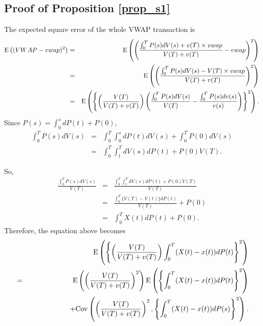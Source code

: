 \subsection{Proof of Proposition \ref{prop_s1}}
The expected square error of the whole VWAP transaction is
\begin{eqnarray*}
   {\mathrm{E}}\left( (VWAP-vwap)^2 \right)
    & = & {\mathrm{E}}\left( \left(\frac{\int_0^T P(s)dV(s)+v(T) \times vwap}{V(T)+v(T)}-vwap\right)^2 \right) \\
    & = & {\mathrm{E}}\left( \left(\frac{\int_0^T P(s)dV(s)-V(T) \times vwap}{V(T)+v(T)}\right)^2 \right) \\
    & = & {\mathrm{E}}\left( \left\{\left(\frac{V(T)}{V(T)+v(T)}\right)\left(\frac{\int_0^T P(s)dV(s)}{V(T)}-\frac{\int_0^T P(s)dv(s)}{v(s)}\right)\right\}^2 \right).
\end{eqnarray*}
Since $P(s)=\int_0^s dP(t)+P(0)$,
\begin{eqnarray*}
  \int_0^T P(s)dV(s)
  & = & \int_0^T \int_0^s dP(t)dV(s) +\int_0^T P(0)dV(s) \\
  & = & \int_0^T \int_t^T dV(s)dP(t) + P(0)V(T).
\end{eqnarray*}

So,
\begin{eqnarray*}
  \frac{\int_0^T P(s)dV(s)}{V(T)}
  & = & \frac{\int_0^T \int_t^T  dV(s)dP(t)+P(0)V(T)}{V(T)} \\
  & = & \frac{\int_0^T \{V(T)-V(t)\}dP(t)}{V(T)}+P(0)\\
  & = & \int_0^T X(t)dP(t)+P(0).
\end{eqnarray*}
Therefore, the equation above becomes
\begin{eqnarray*}
   &   & {\mathrm{E}}\left( \left\{\left(\frac{V(T)}{V(T)+v(T)}\right)\int_0^T (X(t)-x(t))dP(t)\right\}^2 \right) \\
   & = & {\mathrm{E}}\left( \left(\frac{V(T)}{V(T)+v(T)}\right)^2 \right) {\mathrm{E}}\left( \left\{ \int_0^T (X(t)-x(t))dP(t) \right\}^2 \right) \\
   & & \hspace{2cm} +{\mathrm{Cov}}\left( \left(\frac{V(T)}{V(T)+v(T)}\right)^2, \left\{ \int_0^T (X(t)-x(t))dP(s) \right\}^2 \right).
\end{eqnarray*}

